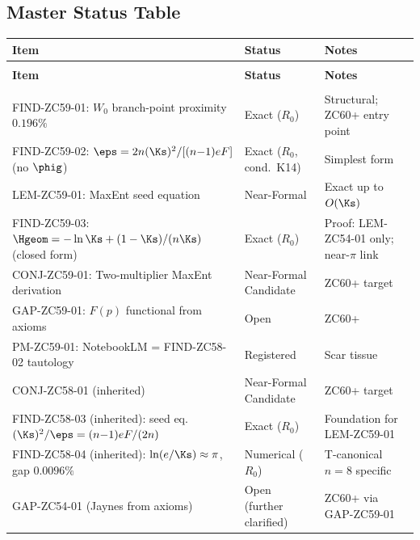 \documentclass[12pt, a4paper]{article}
\begin{document}
\subsection{Master Status Table}
\label{sec:status}

{\small
\setlength{\LTpre}{4pt}\setlength{\LTpost}{4pt}
\renewcommand{\arraystretch}{1.30}
\begin{longtable}{>{\raggedright\arraybackslash}p{6.8cm}
                  >{\centering\arraybackslash}p{2.4cm}
                  >{\raggedright\arraybackslash}p{3.5cm}}
\toprule
\textbf{Item} & \textbf{Status} & \textbf{Notes} \\
\midrule
\endfirsthead
\multicolumn{3}{l}{\small\textit{(continued)}}\\[4pt]
\toprule
\textbf{Item} & \textbf{Status} & \textbf{Notes} \\
\midrule
\endhead
\midrule
\multicolumn{3}{r}{\small\textit{(continues)}}\\
\endfoot
\bottomrule
\endlastfoot
FIND-ZC59-01: $W_0$ branch-point proximity $0.196\%$
  & Exact ($R_0$) & Structural; ZC60+ entry point \\
FIND-ZC59-02: $\eps = 2n(\Ks)^2/[(n{-}1)eF]$ (no $\phig$)
  & Exact ($R_0$, cond.\ K14) & Simplest form \\
LEM-ZC59-01: MaxEnt seed equation
  & Near-Formal & Exact up to $O(\Ks)$ \\
FIND-ZC59-03: $\Hgeom = -\ln\Ks + (1-\Ks)/(n\Ks)$ (closed form)
  & Exact ($R_0$) & Proof: LEM-ZC54-01 only; near-$\pi$ link \\
CONJ-ZC59-01: Two-multiplier MaxEnt derivation
  & Near-Formal Candidate & ZC60+ target \\
GAP-ZC59-01: $F(p)$ functional from axioms
  & Open & ZC60+ \\
PM-ZC59-01: NotebookLM = FIND-ZC58-02 tautology
  & Registered & Scar tissue \\
\midrule
CONJ-ZC58-01 (inherited)
  & Near-Formal Candidate & ZC60+ target \\
FIND-ZC58-03 (inherited): seed eq.\ $(\Ks)^2/\eps=(n{-}1)eF/(2n)$
  & Exact ($R_0$) & Foundation for LEM-ZC59-01 \\
FIND-ZC58-04 (inherited): $\ln(e/\Ks)\approx\pi$, gap $0.0096\%$
  & Numerical ($R_0$) & T-canonical $n=8$ specific \\
GAP-ZC54-01 (Jaynes from axioms)
  & Open (further clarified) & ZC60+ via GAP-ZC59-01 \\
\bottomrule
\end{longtable}
}
\end{document}
